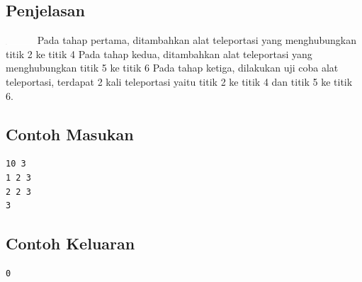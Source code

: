 \documentclass{article}
\begin{document}
\subsection*{Penjelasan}
\includegraphics[width=40px]{contoh.png}
Pada tahap pertama, ditambahkan alat teleportasi yang menghubungkan titik 2 ke titik 4
Pada tahap kedua, ditambahkan alat teleportasi yang menghubungkan titik 5 ke titik 6
Pada tahap ketiga, dilakukan uji coba alat teleportasi, terdapat 2 kali teleportasi yaitu titik 2 ke titik 4 dan titik 5 ke titik 6.
\pagebreak

\begin{multicols}{2}
\subsection*{Contoh Masukan}
\begin{lstlisting}
10 3
1 2 3
2 2 3
3
\end{lstlisting}
\columnbreak
\subsection*{Contoh Keluaran}
\begin{lstlisting}
0
\end{lstlisting}
\vfill
\null
\end{multicols}
\end{document}

